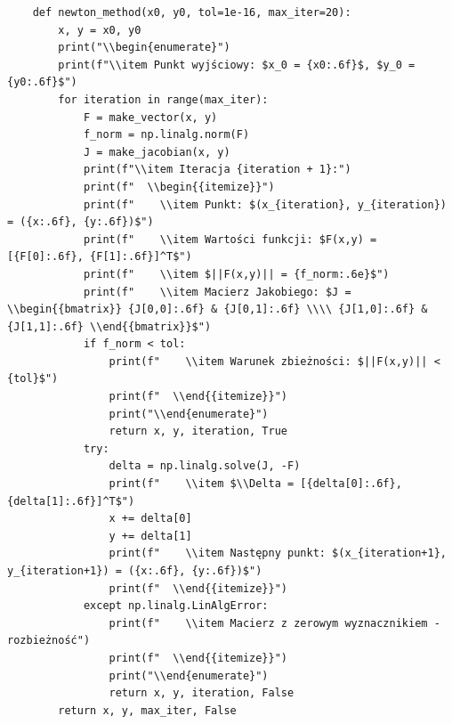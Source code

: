 \documentclass[a4paper,12pt]{article}
\begin{document}
\begin{lstlisting}
    def newton_method(x0, y0, tol=1e-16, max_iter=20):
        x, y = x0, y0
        print("\\begin{enumerate}")
        print(f"\\item Punkt wyjściowy: $x_0 = {x0:.6f}$, $y_0 = {y0:.6f}$")
        for iteration in range(max_iter):
            F = make_vector(x, y)
            f_norm = np.linalg.norm(F)
            J = make_jacobian(x, y)
            print(f"\\item Iteracja {iteration + 1}:")
            print(f"  \\begin{{itemize}}")
            print(f"    \\item Punkt: $(x_{iteration}, y_{iteration}) = ({x:.6f}, {y:.6f})$")
            print(f"    \\item Wartości funkcji: $F(x,y) = [{F[0]:.6f}, {F[1]:.6f}]^T$")
            print(f"    \\item $||F(x,y)|| = {f_norm:.6e}$")
            print(f"    \\item Macierz Jakobiego: $J = \\begin{{bmatrix}} {J[0,0]:.6f} & {J[0,1]:.6f} \\\\ {J[1,0]:.6f} & {J[1,1]:.6f} \\end{{bmatrix}}$")
            if f_norm < tol:
                print(f"    \\item Warunek zbieżności: $||F(x,y)|| < {tol}$")
                print(f"  \\end{{itemize}}")
                print("\\end{enumerate}")
                return x, y, iteration, True
            try:
                delta = np.linalg.solve(J, -F)
                print(f"    \\item $\\Delta = [{delta[0]:.6f}, {delta[1]:.6f}]^T$")
                x += delta[0]
                y += delta[1]
                print(f"    \\item Następny punkt: $(x_{iteration+1}, y_{iteration+1}) = ({x:.6f}, {y:.6f})$")
                print(f"  \\end{{itemize}}")
            except np.linalg.LinAlgError:
                print(f"    \\item Macierz z zerowym wyznacznikiem - rozbieżność")
                print(f"  \\end{{itemize}}")
                print("\\end{enumerate}")
                return x, y, iteration, False
        return x, y, max_iter, False
    

\end{lstlisting}
\end{document}
